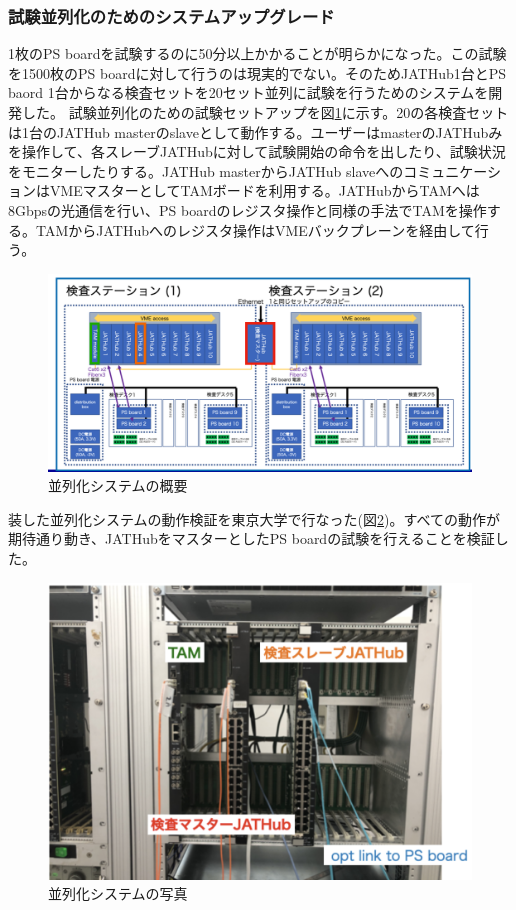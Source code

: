 \subsubsection{試験並列化のためのシステムアップグレード}
\label{subsubsec_parallel}
1枚のPS boardを試験するのに50分以上かかることが明らかになった。この試験を1500枚のPS boardに対して行うのは現実的でない。そのためJATHub1台とPS baord 1台からなる検査セットを20セット並列に試験を行うためのシステムを開発した。
試験並列化のための試験セットアップを図\ref{QAQCpararell}に示す。20の各検査セットは1台のJATHub masterのslaveとして動作する。ユーザーはmasterのJATHubみを操作して、各スレーブJATHubに対して試験開始の命令を出したり、試験状況をモニターしたりする。JATHub masterからJATHub slaveへのコミュニケーションはVMEマスターとしてTAMボードを利用する。JATHubからTAMへは8Gbpsの光通信を行い、PS boardのレジスタ操作と同様の手法でTAMを操作する。TAMからJATHubへのレジスタ操作はVMEバックプレーンを経由して行う。

\begin{figure} 
\centering
\includegraphics[width=16cm]{fig/QAQC/QAQCpararell.png}
\caption[並列化システムの概要]{並列化システムの概要}
\label{QAQCpararell}
\end{figure}
装した並列化システムの動作検証を東京大学で行なった(図\ref{QAQCpararellpicture})。すべての動作が期待通り動き、JATHubをマスターとしたPS boardの試験を行えることを検証した。

\begin{figure} 
\centering
\includegraphics[width=16cm]{fig/QAQC/QAQCpararellpicture.png}
\caption[並列化システムの写真]{並列化システムの写真}
\label{QAQCpararellpicture}
\end{figure}

